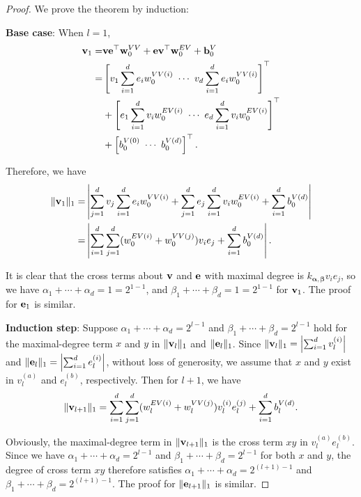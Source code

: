 \documentclass[sigconf]{acmart}
\begin{document}
	\begin{proof}
		We prove the theorem by induction:
		
		\textbf{Base case}: When $l=1$,
		\begin{equation*}
		\begin{split}
			{\bf v}_1 =& {\bf v} {\bf e}^\top {\bf w}_0^{VV} + {\bf e} {\bf v}^\top {\bf w}_0^{EV} + {\bf b}_0^V\\
			=& \left[v_1 \sum_{i=1}^d e_i w_0^{VV(i)} \ \cdots \ v_d \sum_{i=1}^d e_i w_0^{VV(i)} \right]^\top\\
			&+ \left[e_1 \sum_{i=1}^d v_i w_0^{EV(i)} \ \cdots \ e_d \sum_{i=1}^d v_i w_0^{EV(i)} \right]^\top\\
			&+ \left[ b_0^{V(0)} \ \cdots \ b_0^{V(d)} \right]^\top.
		\end{split}
		\end{equation*}
		
		Therefore, we have		
		\begin{equation*}
		\begin{split}
			\|{\bf v}_1\|_1 =& \left| \sum_{j=1}^d v_j \sum_{i=1}^d e_i w_0^{VV(i)} + \sum_{j=1}^d e_j \sum_{i=1}^d v_i w_0^{EV(i)} + \sum_{i=1}^d b_0^{V(d)} \right|\\
			=& \left| \sum_{i=1}^d \sum_{j=1}^d (w_0^{EV(i)} + w_0^{VV(j)}) v_i e_j + \sum_{i=1}^d b_0^{V(d)} \right|.
		\end{split}
		\end{equation*}
		
		It is clear that the cross terms about ${\bf v}$ and ${\bf e}$ with maximal degree is $k_{\bm \alpha, \bm \beta} v_i e_j$, so we have $\alpha_1 + \cdots + \alpha_d = 1 = 2^{1-1}$, and $\beta_1 + \cdots + \beta_d = 1 = 2^{1-1}$ for ${\bf v}_1$.
		The proof for ${\bf e}_1$ is similar.
		
		\textbf{Induction step}: Suppose $\alpha_1 + \cdots + \alpha_d = 2^{l-1}$ and $\beta_1 + \cdots + \beta_d = 2^{l-1}$ hold for the maximal-degree term $x$ and $y$ in $\|{\bf v}_l\|_1$ and $\|{\bf e}_l\|_1$.
		Since $\|{\bf v}_l\|_1 = \left| \sum_{i=1}^d v_l^{(i)} \right|$ and $\|{\bf e}_l\|_1 = \left| \sum_{i=1}^d e_l^{(i)} \right|$, without loss of generosity, we assume that $x$ and $y$ exist in $v_l^{(a)}$ and $e_l^{(b)}$, respectively.
		Then for $l+1$, we have
		\begin{equation*}
			\|{\bf v}_{l+1}\|_1 = \sum_{i=1}^d \sum_{j=1}^d (w_l^{EV(i)} + w_l^{VV(j)}) v_l^{(i)} e_l^{(j)} + \sum_{i=1}^d b_l^{V(d)}.
		\end{equation*}
		
		Obviously, the maximal-degree term in $\|{\bf v}_{l+1}\|_1$ is the cross term $xy$ in $v_l^{(a)} e_l^{(b)}$.
		Since we have $\alpha_1 + \cdots + \alpha_d = 2^{l-1}$ and $\beta_1 + \cdots + \beta_d = 2^{l-1}$ for both $x$ and $y$, the degree of cross term $xy$ therefore satisfies $\alpha_1 + \cdots + \alpha_d = 2^{(l+1)-1}$ and $\beta_1 + \cdots + \beta_d = 2^{(l+1)-1}$.
		The proof for $\|{\bf e}_{l+1}\|_1$ is similar.
	\end{proof}
	
\end{document}
